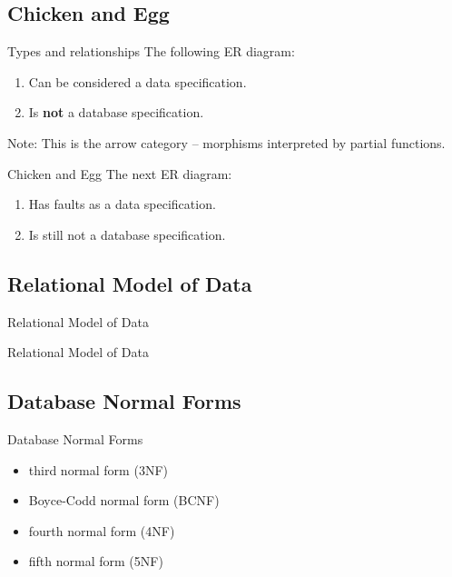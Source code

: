 \documentclass{beamer}
\renewcommand{\erpictureFolder}[0]{../SharedPictures}
\begin{document}
\subsection{Chicken and Egg}
\begin{frame}{Types and relationships}
The following ER diagram:
\begin{center}
\scalebox{0.9}{

}
\end{center}
\begin{center}
\begin{enumerate}
\item Can be considered a data specification.
\item Is \textbf{not} a database specification. 
\end{enumerate}
\end{center}
Note: This is the arrow category -- morphisms interpreted by partial functions. 
\end{frame}
\begin{frame}{Chicken and Egg}
The next ER diagram:
\begin{center}
\scalebox{0.9}{

}
\end{center}
\begin{center}
\begin{enumerate}
\item Has faults as a data specification.
\item Is still not a database specification. 
\end{enumerate}
\end{center}
\end{frame}


\subsection{Relational Model of Data}
\begin{frame}{Relational Model of Data}
\scalebox{0.6}{

}
\end{frame}
\begin{frame}{Relational Model of Data}
\scalebox{0.6}{

}
\end{frame}
\subsection{Database Normal Forms}
\begin{frame}{Database Normal Forms}
\begin{itemize}
\item third normal form (3NF)
\item Boyce-Codd normal form (BCNF)
\item fourth normal form (4NF)
\item fifth normal form (5NF)
\end{itemize}
\end{frame}
\end{document}
